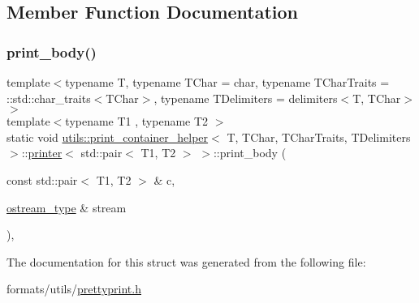 \subsection{Member Function Documentation}
\mbox{\label{structutils_1_1print__container__helper_1_1printer_3_01std_1_1pair_3_01_t1_00_01_t2_01_4_01_4_a5334428662f5371f3e71049005cc8860}} 
\subsubsection{\texorpdfstring{print\_body()}{print\_body()}}
{\footnotesize\ttfamily template$<$typename T, typename T\+Char = char, typename T\+Char\+Traits = \+::std\+::char\+\_\+traits$<$\+T\+Char$>$, typename T\+Delimiters = delimiters$<$\+T, T\+Char$>$$>$ \\
template$<$typename T1 , typename T2 $>$ \\
static void \mbox{\hyperlink{structutils_1_1print__container__helper}{utils\+::print\+\_\+container\+\_\+helper}}$<$ T, T\+Char, T\+Char\+Traits, T\+Delimiters $>$\+::\mbox{\hyperlink{structutils_1_1print__container__helper_1_1printer}{printer}}$<$ std\+::pair$<$ T1, T2 $>$ $>$\+::print\+\_\+body (\begin{DoxyParamCaption}\item[{const std\+::pair$<$ T1, T2 $>$ \&}]{c,  }\item[{\mbox{\hyperlink{structutils_1_1print__container__helper_1_1printer_3_01std_1_1pair_3_01_t1_00_01_t2_01_4_01_4_a170b667e3c3c6f0dae4c03c207517bbd}{ostream\+\_\+type}} \&}]{stream }\end{DoxyParamCaption})\hspace{0.3cm}{\ttfamily [inline]}, {\ttfamily [static]}}



The documentation for this struct was generated from the following file\+:\begin{DoxyCompactItemize}
\item 
formats/utils/\mbox{\hyperlink{prettyprint_8h}{prettyprint.\+h}}\end{DoxyCompactItemize}
